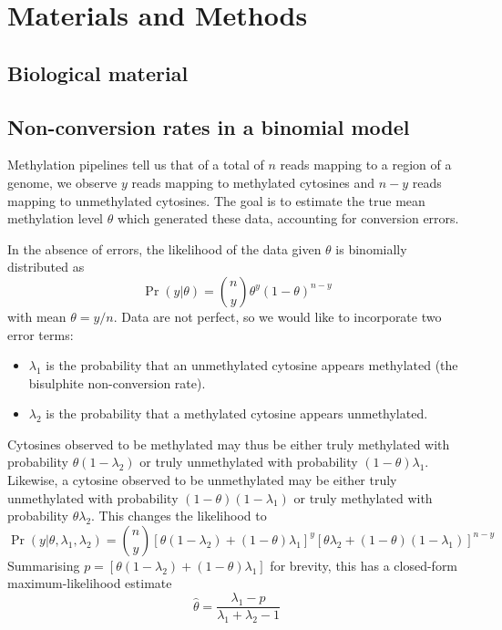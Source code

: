 \documentclass[12pt,longbibliography]{article}
\begin{document}
\section{Materials and Methods}

\subsection{Biological material}

\subsection{Non-conversion rates in a binomial model}

Methylation pipelines tell us that of a total of $n$ reads mapping to a region of a genome, we observe $y$ reads mapping to methylated cytosines and $n-y$ reads mapping to unmethylated cytosines. The goal is to estimate the true mean methylation level $\theta$ which generated these data, accounting for conversion errors.

In the absence of errors, the likelihood of the data given $\theta$ is binomially distributed as
\begin{equation}
    \label{eqn:classic-binomial}
    \Pr(y| \theta) = {n \choose y} \theta^y(1-\theta)^{n-y}
\end{equation}
with mean $\theta=y/n$.
Data are not perfect, so we would like to incorporate two error terms:
\begin{itemize}
    \item $\lambda_1$ is the probability that an unmethylated cytosine appears methylated (the bisulphite non-conversion rate).
    \item $\lambda_2$ is the probability that a methylated cytosine appears unmethylated.
\end{itemize}
Cytosines observed to be methylated may thus be either truly methylated with probability $\theta(1-\lambda_2)$ or truly unmethylated with probability $(1-\theta)\lambda_1$. Likewise, a cytosine observed to be unmethylated may be either truly unmethylated with probability $(1-\theta)(1-\lambda_1)$ or truly methylated with probability $\theta \lambda_2$.
This changes the likelihood to
\begin{equation}
    \label{eqn:binom-with-errors}
    \Pr(y | \theta, \lambda_1, \lambda_2) = 
    {n \choose y}
    [\theta(1-\lambda_2) + (1-\theta)\lambda_1]^y
    [\theta \lambda_2 + (1-\theta)(1-\lambda_1)]^{n-y}
\end{equation}
Summarising $p=[\theta(1-\lambda_2) + (1-\theta)\lambda_1]$ for brevity, this has a closed-form maximum-likelihood estimate
\begin{equation}
    \label{eqn:ml-theta}
    \hat{\theta} = \frac{\lambda_1-p}{\lambda_1 + \lambda_2 -1}
\end{equation}
\end{document}
